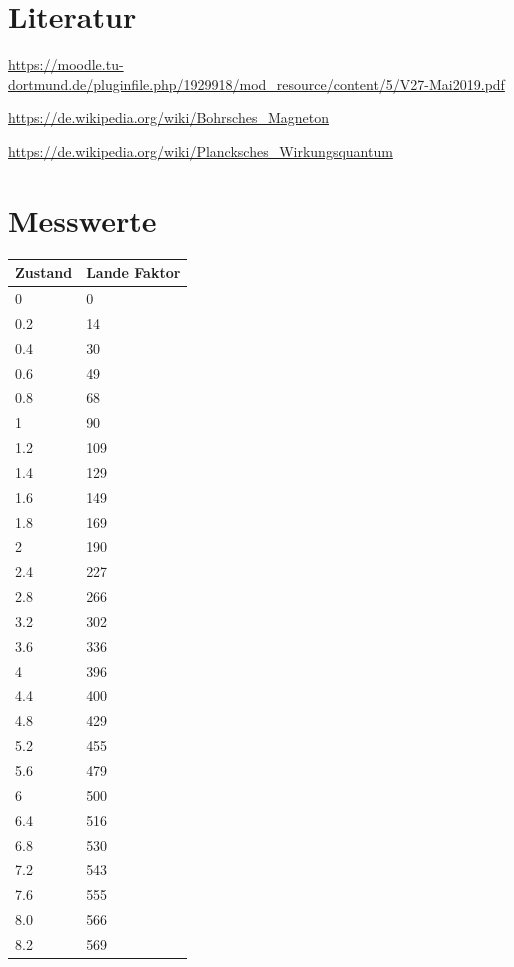 \section{Literatur}

\url{https://moodle.tu-dortmund.de/pluginfile.php/1929918/mod_resource/content/5/V27-Mai2019.pdf}

\noindent \url{https://de.wikipedia.org/wiki/Bohrsches_Magneton}

\noindent \url{https://de.wikipedia.org/wiki/Plancksches_Wirkungsquantum}

\section{Messwerte}

\begin{minipage}{\linewidth}
    \begin{table}[H]
        \centering
    \begin{tabular}{ll}
        \toprule
        Zustand & Lande Faktor \\
        \midrule
        0   & 0 \\
        0.2 & 14 \\
        0.4 & 30 \\
        0.6 & 49 \\
        0.8 & 68 \\
        1   & 90 \\
        1.2 & 109 \\
        1.4 & 129 \\
        1.6 & 149 \\
        1.8 & 169 \\
        2   & 190 \\
        2.4 & 227 \\
        2.8 & 266 \\
        3.2 & 302 \\
        3.6 & 336 \\
        4   & 396 \\
        4.4 & 400 \\
        4.8 & 429 \\
        5.2 & 455 \\
        5.6 & 479 \\
        6   & 500 \\
        6.4 & 516 \\
        6.8 & 530 \\
        7.2 & 543 \\
        7.6 & 555 \\
        8.0 & 566 \\
        8.2 & 569 \\
        \bottomrule   
    \end{tabular}
    
    \label{tab:2}
\end{table}
\end{minipage}

